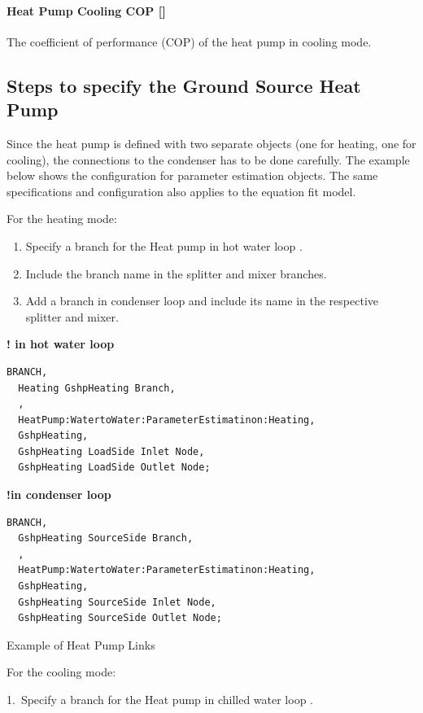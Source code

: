 \paragraph{Heat Pump Cooling COP {[}{]}} The coefficient of performance (COP) of
the heat pump in cooling mode.

\subsection{Steps to specify the Ground Source Heat Pump}\label{steps-to-specify-the-ground-source-heat-pump}

Since the heat pump is defined with two separate objects (one for heating, one for cooling), the connections to the condenser has to be done carefully. The example below shows the configuration for parameter estimation objects. The same specifications and configuration also applies to the equation fit model.

For the heating mode:

\begin{enumerate}
    \def\labelenumi{\arabic{enumi}.}
    \item
    Specify a branch for the Heat pump in hot water loop .
    \item
    Include the branch name in the splitter and mixer branches.
    \item
    Add a branch in condenser loop and include its name in the respective splitter and mixer.
\end{enumerate}

\textbf{! in hot water loop}

\begin{lstlisting}
BRANCH,
  Heating GshpHeating Branch,
  ,
  HeatPump:WatertoWater:ParameterEstimatinon:Heating,
  GshpHeating,
  GshpHeating LoadSide Inlet Node,
  GshpHeating LoadSide Outlet Node;
\end{lstlisting}

\textbf{!in condenser loop}

\begin{lstlisting}
BRANCH,
  GshpHeating SourceSide Branch,
  ,
  HeatPump:WatertoWater:ParameterEstimatinon:Heating,
  GshpHeating,
  GshpHeating SourceSide Inlet Node,
  GshpHeating SourceSide Outlet Node;
\end{lstlisting}

Example of Heat Pump Links

For the cooling mode:

1.~Specify a branch for the Heat pump in chilled water loop .

